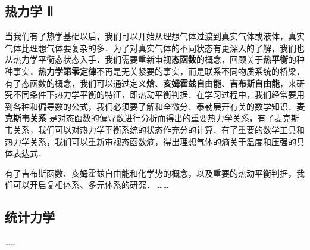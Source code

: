 \subsection{热力学 Ⅱ}

当我们有了热学基础以后，我们可以开始从理想气体过渡到真实气体或液体，真实气体比理想气体要复杂的多．为了对真实气体的不同状态有更深入的了解，我们也从热力学平衡态状态入手．我们需要重新审视\textbf{态函数}的概念，回顾关于\textbf{热平衡}的种种事实．\textbf{热力学第零定律}不再是无关紧要的事实，而是联系不同物质系统的桥梁．有了态函数的概念，我们可以通过定义\textbf{焓}、\textbf{亥姆霍兹自由能}、\textbf{吉布斯自由能}，来研究不同条件下热力学平衡的特征，即热动平衡判据．在学习过程中，我们经常要用到各种和偏导数的公式，我们必须要了解和全微分、泰勒展开有关的数学知识．\textbf{麦克斯韦关系} 是对态函数的偏导数进行分析而得出的重要热力学关系，有了麦克斯韦关系，我们可以对热力学平衡系统的状态作充分的计算．有了重要的数学工具和热力学关系，我们可以重新审视态函数熵，得出理想气体的熵关于温度和压强的具体表达式．

有了吉布斯函数、亥姆霍兹自由能和化学势的概念，以及重要的热动平衡判据，我们可以开启复相体系、多元体系的研究．
……


\subsection{统计力学}
……
